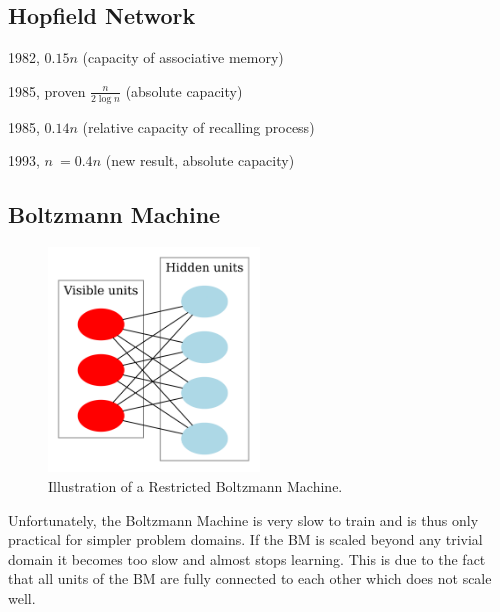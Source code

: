 \documentclass[12pt, a4paper]{article}
\begin{document}
\subsection{Hopfield Network}


1982, $0.15n$ (capacity of associative memory)


1985, proven $ \frac{n}{2\log{n}} $ (absolute capacity)

1985, $0.14n$ (relative capacity of recalling process)

1993, $ n ~= 0.4n $ (new result, absolute capacity)

\subsection{Boltzmann Machine}


\begin{figure}[htbp]
	\begin{center}
		\includegraphics[width=0.5\textwidth]{inc/Restricted_Boltzmann_machine.png}
		\caption{Illustration of a Restricted Boltzmann Machine.\protect\footnotemark}
		\label{fig:restricted_boltzmann_machine}
	\end{center}
\end{figure}

Unfortunately, the Boltzmann Machine is very slow to train and is thus only practical for simpler problem domains. If the BM is scaled beyond any trivial domain it becomes too slow and almost stops learning. This is due to the fact that all units of the BM are fully connected to each other which does not scale well.
\end{document}
